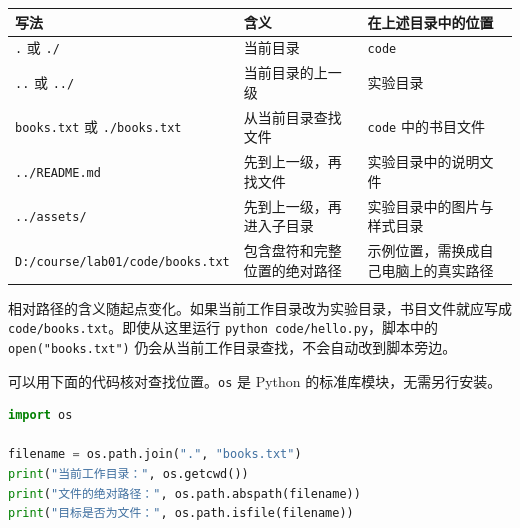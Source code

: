 \documentclass[UTF8,a4paper,11pt,fontset=fandol]{ctexart}
\providecommand{\passthrough}[1]{#1}
\begin{document}
\begin{longtable}[]{@{}
  >{\raggedright\arraybackslash}p{}
  >{\raggedright\arraybackslash}p{}
  >{\raggedright\arraybackslash}p{}@{}}
\toprule\noalign{}
\begin{minipage}[b]{\linewidth}\raggedright
写法
\end{minipage} & \begin{minipage}[b]{\linewidth}\raggedright
含义
\end{minipage} & \begin{minipage}[b]{\linewidth}\raggedright
在上述目录中的位置
\end{minipage} \\
\midrule\noalign{}
\endhead
\bottomrule\noalign{}
\endlastfoot
\passthrough{\lstinline!.!} 或 \passthrough{\lstinline!./!} & 当前目录 & \passthrough{\lstinline!code!} \\
\passthrough{\lstinline!..!} 或 \passthrough{\lstinline!../!} & 当前目录的上一级 & 实验目录 \\
\passthrough{\lstinline!books.txt!} 或 \passthrough{\lstinline!./books.txt!} & 从当前目录查找文件 & \passthrough{\lstinline!code!} 中的书目文件 \\
\passthrough{\lstinline!../README.md!} & 先到上一级，再找文件 & 实验目录中的说明文件 \\
\passthrough{\lstinline!../assets/!} & 先到上一级，再进入子目录 & 实验目录中的图片与样式目录 \\
\passthrough{\lstinline!D:/course/lab01/code/books.txt!} & 包含盘符和完整位置的绝对路径 & 示例位置，需换成自己电脑上的真实路径 \\
\end{longtable}

相对路径的含义随起点变化。如果当前工作目录改为实验目录，书目文件就应写成 \passthrough{\lstinline!code/books.txt!}。即使从这里运行 \passthrough{\lstinline!python code/hello.py!}，脚本中的 \passthrough{\lstinline!open("books.txt")!} 仍会从当前工作目录查找，不会自动改到脚本旁边。

可以用下面的代码核对查找位置。\passthrough{\lstinline!os!} 是 Python 的标准库模块，无需另行安装。

\begin{lstlisting}[language=Python]
import os

filename = os.path.join(".", "books.txt")
print("当前工作目录：", os.getcwd())
print("文件的绝对路径：", os.path.abspath(filename))
print("目标是否为文件：", os.path.isfile(filename))
\end{lstlisting}
\end{document}
